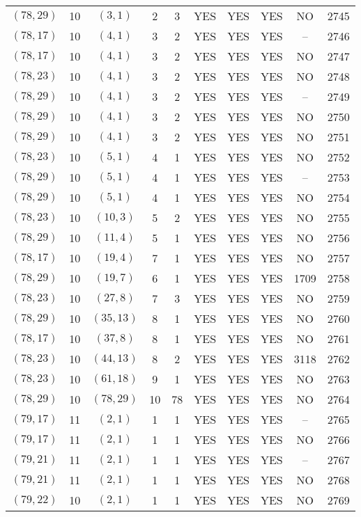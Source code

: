 \begin{longtable}{|c|c|c|c|c|c|c|c|c|c|}
$(78, 29)$ & 10 & $(3, 1)$ & 2 & 3 & YES & YES & YES & NO & 2745\\
$(78, 17)$ & 10 & $(4, 1)$ & 3 & 2 & YES & YES & YES & -- & 2746\\
$(78, 17)$ & 10 & $(4, 1)$ & 3 & 2 & YES & YES & YES & NO & 2747\\
$(78, 23)$ & 10 & $(4, 1)$ & 3 & 2 & YES & YES & YES & NO & 2748\\
$(78, 29)$ & 10 & $(4, 1)$ & 3 & 2 & YES & YES & YES & -- & 2749\\
$(78, 29)$ & 10 & $(4, 1)$ & 3 & 2 & YES & YES & YES & NO & 2750\\
$(78, 29)$ & 10 & $(4, 1)$ & 3 & 2 & YES & YES & YES & NO & 2751\\
$(78, 23)$ & 10 & $(5, 1)$ & 4 & 1 & YES & YES & YES & NO & 2752\\
$(78, 29)$ & 10 & $(5, 1)$ & 4 & 1 & YES & YES & YES & -- & 2753\\
$(78, 29)$ & 10 & $(5, 1)$ & 4 & 1 & YES & YES & YES & NO & 2754\\
$(78, 23)$ & 10 & $(10, 3)$ & 5 & 2 & YES & YES & YES & NO & 2755\\
$(78, 29)$ & 10 & $(11, 4)$ & 5 & 1 & YES & YES & YES & NO & 2756\\
$(78, 17)$ & 10 & $(19, 4)$ & 7 & 1 & YES & YES & YES & NO & 2757\\
$(78, 29)$ & 10 & $(19, 7)$ & 6 & 1 & YES & YES & YES & 1709 & 2758\\
$(78, 23)$ & 10 & $(27, 8)$ & 7 & 3 & YES & YES & YES & NO & 2759\\
$(78, 29)$ & 10 & $(35, 13)$ & 8 & 1 & YES & YES & YES & NO & 2760\\
$(78, 17)$ & 10 & $(37, 8)$ & 8 & 1 & YES & YES & YES & NO & 2761\\
$(78, 23)$ & 10 & $(44, 13)$ & 8 & 2 & YES & YES & YES & 3118 & 2762\\
$(78, 23)$ & 10 & $(61, 18)$ & 9 & 1 & YES & YES & YES & NO & 2763\\
$(78, 29)$ & 10 & $(78, 29)$ & 10 & 78 & YES & YES & YES & NO & 2764\\
$(79, 17)$ & 11 & $(2, 1)$ & 1 & 1 & YES & YES & YES & -- & 2765\\
$(79, 17)$ & 11 & $(2, 1)$ & 1 & 1 & YES & YES & YES & NO & 2766\\
$(79, 21)$ & 11 & $(2, 1)$ & 1 & 1 & YES & YES & YES & -- & 2767\\
$(79, 21)$ & 11 & $(2, 1)$ & 1 & 1 & YES & YES & YES & NO & 2768\\
$(79, 22)$ & 10 & $(2, 1)$ & 1 & 1 & YES & YES & YES & NO & 2769\\

\end{longtable}

